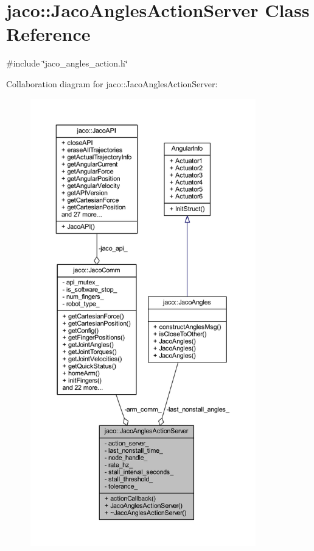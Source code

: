 \hypertarget{classjaco_1_1JacoAnglesActionServer}{}\section{jaco\+:\+:Jaco\+Angles\+Action\+Server Class Reference}
\label{classjaco_1_1JacoAnglesActionServer}


{\ttfamily \#include \char`\"{}jaco\+\_\+angles\+\_\+action.\+h\char`\"{}}



Collaboration diagram for jaco\+:\+:Jaco\+Angles\+Action\+Server\+:
\nopagebreak
\begin{figure}[H]
\begin{center}
\leavevmode
\includegraphics[height=550pt]{d7/d31/classjaco_1_1JacoAnglesActionServer__coll__graph}
\end{center}
\end{figure}
